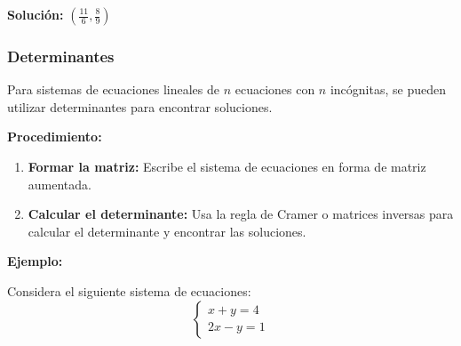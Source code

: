     \textbf{Solución:} \( \left( \frac{11}{6}, \frac{8}{9} \right) \)
    
     
    \subsubsection{Determinantes}
    
    Para sistemas de ecuaciones lineales de $n$ ecuaciones con $n$ incógnitas, se pueden utilizar determinantes para encontrar soluciones.
    
    \textbf{Procedimiento:}
    \begin{enumerate}
        \item \textbf{Formar la matriz:} Escribe el sistema de ecuaciones en forma de matriz aumentada.
        \item \textbf{Calcular el determinante:} Usa la regla de Cramer o matrices inversas para calcular el determinante y encontrar las soluciones.
    \end{enumerate}
    
    \textbf{Ejemplo:}
    
    Considera el siguiente sistema de ecuaciones:
    \[
    \begin{cases}
    x + y = 4 \\
    2x - y = 1
    \end{cases}
    \]
    
